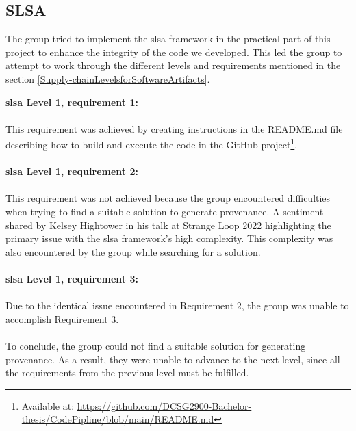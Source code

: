 \subsection{SLSA}
The group tried to implement the \acrshort{slsa} framework in the practical part of this project to enhance the integrity of the code we developed. This led the group to attempt to work through the different levels and requirements mentioned in the section \ref{Supply-chainLevelsforSoftwareArtifacts}.

\textbf{\acrshort{slsa} Level 1, requirement 1:}
\textit{} \cite{SLSAlevels}
\\~\\
This requirement was achieved by creating instructions in the README.md file describing how to build and execute the code in the GitHub project\footnote{Available at: \url{https://github.com/DCSG2900-Bachelor-thesis/CodePipline/blob/main/README.md}}. 
\\~\\
\textbf{\acrshort{slsa} Level 1, requirement 2:}
\textit{} \cite{SLSAlevels}
\\~\\
This requirement was not achieved because the group encountered difficulties when trying to find a suitable solution to generate \gls{provenance}. A sentiment shared by Kelsey Hightower in his talk at Strange Loop 2022 \cite{The-Secure-Software-Supply-Chain} highlighting the primary issue with the \acrshort{slsa} framework's high complexity. This complexity was also encountered by the group while searching for a solution.
\\~\\
\textbf{\acrshort{slsa} Level 1, requirement 3:}
\textit{} \cite{SLSAlevels}
\\~\\
Due to the identical issue encountered in Requirement 2, the group was unable to accomplish Requirement 3.
\\~\\
To conclude, the group could not find a suitable solution for generating \gls{provenance}. As a result, they were unable to advance to the next level, since all the requirements from the previous level must be fulfilled.
 
